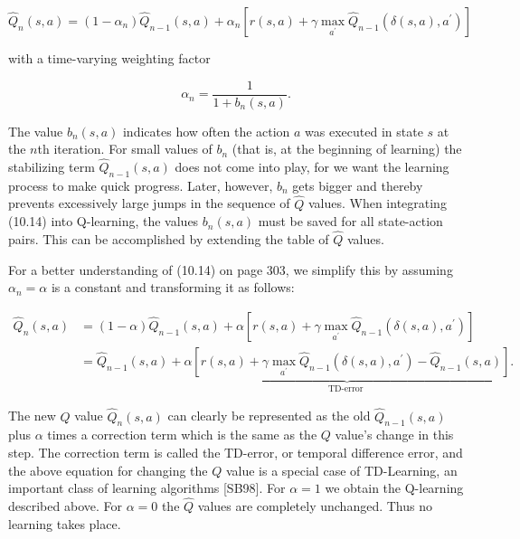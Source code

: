 \documentclass[10pt]{article}
\begin{document}
\begin{equation*}
\hat{Q}_{n}(s, a)=\left(1-\alpha_{n}\right) \hat{Q}_{n-1}(s, a)+\alpha_{n}\left[r(s, a)+\gamma \max _{a^{\prime}} \hat{Q}_{n-1}\left(\delta(s, a), a^{\prime}\right)\right] \tag{10.14}
\end{equation*}


with a time-varying weighting factor

$$
\alpha_{n}=\frac{1}{1+b_{n}(s, a)} .
$$

The value $b_{n}(s, a)$ indicates how often the action $a$ was executed in state $s$ at the $n$th iteration. For small values of $b_{n}$ (that is, at the beginning of learning) the stabilizing term $\hat{Q}_{n-1}(s, a)$ does not come into play, for we want the learning process to make quick progress. Later, however, $b_{n}$ gets bigger and thereby prevents excessively large jumps in the sequence of $\hat{Q}$ values. When integrating (10.14) into Q-learning, the values $b_{n}(s, a)$ must be saved for all state-action pairs. This can be accomplished by extending the table of $\hat{Q}$ values.

For a better understanding of (10.14) on page 303, we simplify this by assuming $\alpha_{n}=\alpha$ is a constant and transforming it as follows:

$$
\begin{aligned}
\hat{Q}_{n}(s, a) & =(1-\alpha) \hat{Q}_{n-1}(s, a)+\alpha\left[r(s, a)+\gamma \max _{a^{\prime}} \hat{Q}_{n-1}\left(\delta(s, a), a^{\prime}\right)\right] \\
& =\hat{Q}_{n-1}(s, a)+\underbrace{\alpha\left[r(s, a)+\gamma \max _{a^{\prime}} \hat{Q}_{n-1}\left(\delta(s, a), a^{\prime}\right)-\hat{Q}_{n-1}(s, a)\right]}_{\text {TD-error }} .
\end{aligned}
$$

The new $Q$ value $\hat{Q}_{n}(s, a)$ can clearly be represented as the old $\hat{Q}_{n-1}(s, a)$ plus $\alpha$ times a correction term which is the same as the $Q$ value's change in this step. The correction term is called the TD-error, or temporal difference error, and the above equation for changing the $Q$ value is a special case of TD-Learning, an important class of learning algorithms [SB98]. For $\alpha=1$ we obtain the Q-learning described above. For $\alpha=0$ the $\hat{Q}$ values are completely unchanged. Thus no learning takes place.
\end{document}
